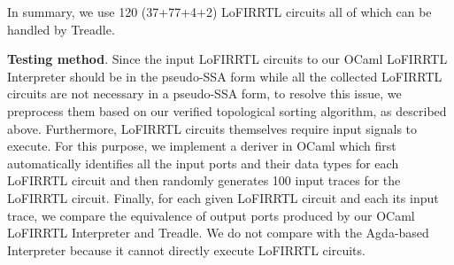 In summary, we use 120 (37+77+4+2) LoFIRRTL circuits all of which can be handled by Treadle.

\smallskip\noindent
{\bf Testing method}.
Since the input LoFIRRTL circuits to our OCaml LoFIRRTL  Interpreter should be in the pseudo-SSA form
while all the collected LoFIRRTL circuits are not necessary in a pseudo-SSA form,
to resolve this issue, we preprocess them based on our verified
topological sorting algorithm, as described above.
Furthermore, LoFIRRTL circuits themselves require input signals to execute.
For this purpose, we implement a deriver in OCaml which first automatically identifies
all the input ports and their data types for each LoFIRRTL circuit and then randomly generates 100 input traces for
the LoFIRRTL circuit. Finally, for each given LoFIRRTL circuit and each its input trace,
we compare the equivalence of output ports produced by our OCaml LoFIRRTL  Interpreter and Treadle.
We do not compare with the Agda-based Interpreter because it cannot directly execute LoFIRRTL circuits.

\begin{table}[!t]
\caption{Results of conformance testing}\small %
\label{tab:conformancetesting}
\end{table}
 	 	 	

